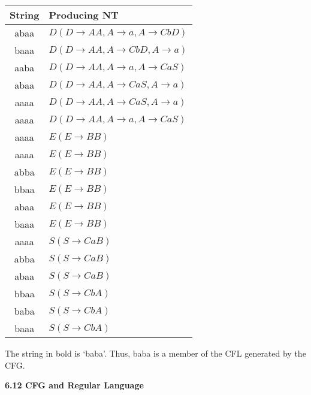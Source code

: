 \documentclass[a4]{article}
\begin{document}
\begin{center}
\begin{tabular}{cl}
\hline

\hline

\hline

\hline
String & Producing NT \\
\hline
abaa & $D (D \rightarrow AA, A \rightarrow a, A \rightarrow CbD)$ \\
baaa & $D (D \rightarrow AA, A \rightarrow CbD, A \rightarrow a)$ \\
aaba & $D (D \rightarrow AA, A \rightarrow a, A \rightarrow CaS)$ \\
abaa & $D (D \rightarrow AA, A \rightarrow CaS, A \rightarrow a)$ \\
aaaa & $D (D \rightarrow AA, A \rightarrow CaS, A \rightarrow a)$ \\
aaaa & $D (D \rightarrow AA, A \rightarrow a, A \rightarrow CaS)$ \\
aaaa & $E (E \rightarrow BB)$ \\
aaaa & $E (E \rightarrow BB)$ \\
abba & $E (E \rightarrow BB)$ \\
bbaa & $E (E \rightarrow BB)$ \\
abaa & $E (E \rightarrow BB)$ \\
baaa & $E (E \rightarrow BB)$ \\
aaaa & $S (S \rightarrow CaB)$ \\
abba & $S (S \rightarrow CaB)$ \\
abaa & $S (S \rightarrow CaB)$ \\
bbaa & $S (S \rightarrow CbA)$ \\
baba & $S (S \rightarrow CbA)$ \\
baaa & $S (S \rightarrow CbA)$ \\
\hline

\hline

\hline

\hline

\end{tabular}
\end{center}


\vspace*{0.2cm}
\hspace*{0.5cm} The string in bold is ‘baba’. Thus, baba is a member of the CFL generated by the CFG.\\

\vspace*{0.1cm}

\large{
\textbf{6.12 CFG and Regular Language}\\
}
\end{document}
